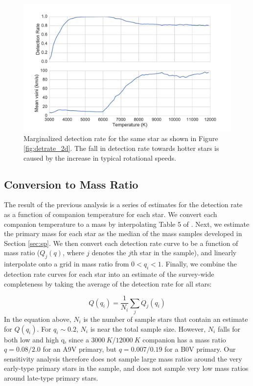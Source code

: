 \documentclass{emulateapj}
\begin{document}
\begin{figure}
\includegraphics[width=\columnwidth]{HIP_24244_20130919_marginalized.pdf}
\caption{Marginalized detection rate for the same star as shown in Figure \ref{fig:detrate_2d}. The fall in detection rate towards hotter stars is caused by the increase in typical rotational speeds.}
\label{fig:marginalized}
\end{figure}

\subsection{Conversion to Mass Ratio}

The result of the previous analysis is a series of estimates for the detection rate as a function of companion temperature for each star. We convert each companion temperature to a mass by interpolating Table 5 of \citet{Pecaut2013}. Next, we estimate the primary mass for each star as the median of the mass samples developed in Section \ref{sec:sp}. We then convert each detection rate curve to be a function of mass ratio ($Q_j(q)$, where $j$ denotes the $j$th star in the sample), and linearly interpolate onto a grid in mass ratio from $0 < q_i < 1$. Finally, we combine the detection rate curves for each star into an estimate of the survey-wide completeness by taking the average of the detection rate for all stars:

\begin{equation}
Q(q_i) = \frac{1}{N_i} \sum_j Q_j(q_i)
\label{eqn:completeness}
\end{equation}
In the equation above, $N_i$ is the number of sample stars that contain an estimate for $Q(q_i)$. For $q_i \sim 0.2$, $N_i$ is near the total sample size. However, $N_i$ falls for both low and high q, since a $3000\ K$/$12000\ K$ companion has a mass ratio $q = 0.08/2.0$ for an A9V primary, but $q = 0.007/0.19$ for a B0V primary. Our sensitivity analysis therefore does not sample large mass ratios around the very early-type primary stars in the sample, and does not sample very low mass ratios around late-type primary stars.
\end{document}
